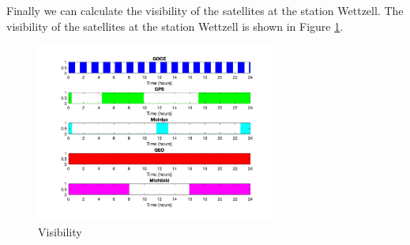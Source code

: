 \documentclass[12pt
,headinclude
,headsepline
,bibtotocnumbered
]{scrartcl}
\begin{document}
Finally we can calculate the visibility of the satellites at the station Wettzell. The visibility of the satellites at the station Wettzell is shown in Figure \ref{fig:visibility}.
\begin{figure}[H]
    \centering
    \includegraphics[width=0.7\textwidth]{plots/visual.png}
    \caption{Visibility}
    \label{fig:visibility}
\end{figure}
\end{document}
